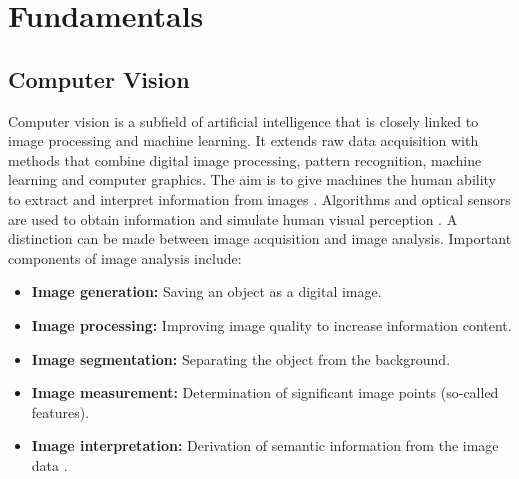 \chapter{Fundamentals}
\label{ch:fundamentals}

\section{Computer Vision}
Computer vision is a subfield of artificial intelligence that is closely linked to image processing and machine learning. It extends raw data acquisition with methods that combine digital image processing, pattern recognition, machine learning and computer graphics. The aim is to give machines the human ability to extract and interpret information from images \citep{Wiley2018}. Algorithms and optical sensors are used to obtain information and simulate human visual perception \citep{Matiacevich2013}. A distinction can be made between image acquisition and image analysis. Important components of image analysis include:
\begin{itemize}
    \item \textbf{Image generation:} Saving an object as a digital image.
    \item \textbf{Image processing:} Improving image quality to increase information content.
    \item \textbf{Image segmentation:} Separating the object from the background.

    \item \textbf{Image measurement:} Determination of significant image points (so-called features).
    \item \textbf{Image interpretation:} Derivation of semantic information from the image data \citep{Mery2013}.
\end{itemize}





